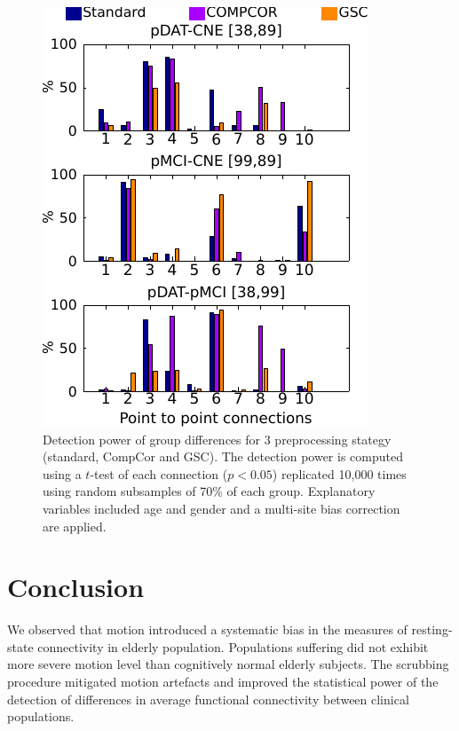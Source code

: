 \begin{figure}[H]
\begin{center}
\includegraphics[width=0.5\linewidth]{../figures/p2pdetection_gsc_compcor.pdf}
\end{center}
\caption[Detection power with CompCor and GSC]{
Detection power of group differences for 3 preprocessing stategy (standard, CompCor and GSC). The detection power is computed using a $t$-test of each connection ($p<0.05$) replicated 10,000 times using random subsamples of 70\% of each group. Explanatory variables included age and gender and a multi-site bias correction are applied.
}
\label{fig_sup_p2p_gsc_compcor}
\end{figure}


\section{Conclusion} We observed that motion introduced a systematic bias in the measures of resting-state connectivity in elderly population. Populations suffering did not exhibit more severe motion level than cognitively normal elderly subjects. The scrubbing procedure mitigated motion artefacts and improved the statistical power of the detection of differences in average functional connectivity between clinical populations.
